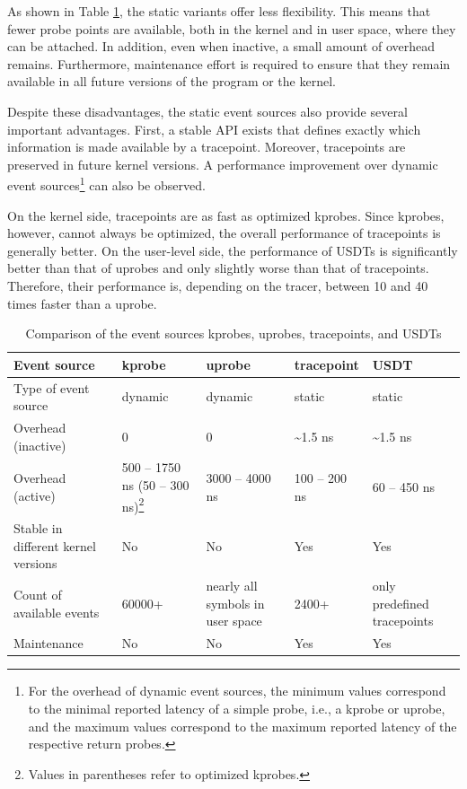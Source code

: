 As shown in Table \ref{tab:event}, the static variants offer less flexibility.  
This means that fewer probe points are available, both in the kernel and in user space, where they can be attached.  
In addition, even when inactive, a small amount of overhead remains.  
Furthermore, maintenance effort is required to ensure that they remain available in all future versions of the program or the kernel.  

Despite these disadvantages, the static event sources also provide several important advantages.  
First, a stable API exists that defines exactly which information is made available by a tracepoint.  
Moreover, tracepoints are preserved in future kernel versions.  
A performance improvement over dynamic event sources\footnote{For the overhead of dynamic event sources, the minimum values correspond to the minimal reported latency of a simple probe, i.e., a \ac{kprobe} or \ac{uprobe}, and the maximum values correspond to the maximum reported latency of the respective return probes.} can also be observed.  

On the kernel side, tracepoints are as fast as optimized \acp{kprobe}.  
Since \acp{kprobe}, however, cannot always be optimized, the overall performance of tracepoints is generally better.  
On the user-level side, the performance of \acp{USDT} is significantly better than that of \acp{uprobe} and only slightly worse than that of tracepoints.
Therefore, their performance is, depending on the tracer, between 10 and 40 times faster than a \ac{uprobe}.  

\begin{table}[ht]
\centering
\begin{tabular}{ ||p{3.5cm} || p{2.5cm} | p{2.5cm} | p{2.5cm} | p{2.5cm}|| } 
 \hline
\textbf{Event source} & \textbf{\ac{kprobe}} & \textbf{\ac{uprobe}} & \textbf{tracepoint} & \textbf{\ac{USDT}} \\ 
   \hline\hline
 Type of event source & dynamic & dynamic & static & static  \\ 
 \hline
 Overhead (inactive) & 0 & 0 & \textasciitilde 1.5 ns & \textasciitilde 1.5 ns  \\ 
 \hline
 Overhead (active) & 500 -- 1750 ns (50 -- 300 ns)\footnote{Values in parentheses refer to optimized \acp{kprobe}.} & 3000 -- 4000 ns & 100 -- 200 ns &  60 -- 450 ns  \\ 
 \hline 
 Stable in different kernel versions & No & No & Yes & Yes \\ 
 \hline
 Count of available events & 60000+ & nearly all symbols in user space & 2400+ & only predefined tracepoints \\ 
 \hline
 Maintenance & No & No & Yes & Yes \\ 
 \hline
\end{tabular}
\caption{Comparison of the event sources kprobes, uprobes, tracepoints, and USDTs}
\label{tab:event}
\end{table}

